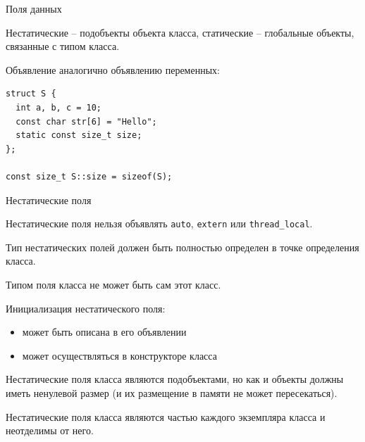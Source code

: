\documentclass[unknownkeysallowed,xcolor=table]{beamer}
\begin{document}
\begin{frame}[fragile]{Поля данных}

Нестатические -- подобъекты объекта класса, статические -- глобальные объекты, связанные с типом класса.

\vspace{1em}

Объявление аналогично объявлению переменных:

\begin{lstlisting}
struct S {
  int a, b, c = 10;
  const char str[6] = "Hello";
  static const size_t size;
};

const size_t S::size = sizeof(S);

\end{lstlisting}

\end{frame}

\begin{frame}{Нестатические поля}

Нестатические поля нельзя объявлять \lstinline{auto}, \lstinline{extern} или \lstinline{thread_local}.

\vspace{0.5em}

Тип нестатических полей должен быть полностью определен в точке определения класса.

\vspace{0.5em}

Типом поля класса не может быть сам этот класс.

\vspace{0.5em}

Инициализация нестатического поля:
\begin{itemize}
  \item может быть описана в его объявлении
  \item может осуществляться в конструкторе класса
\end{itemize}

\vspace{0.5em}

Нестатические поля класса являются подобъектами, но как и объекты должны иметь ненулевой размер (и их размещение в памяти не может пересекаться).

\vspace{0.5em}

Нестатические поля класса являются частью каждого экземпляра класса и неотделимы от него.

\end{frame}
\end{document}
